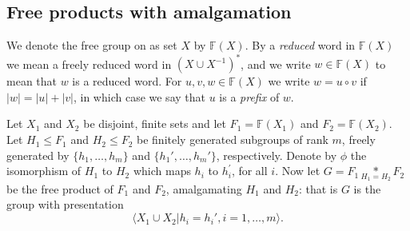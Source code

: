 \documentclass[a4paper,12pt]{article}
\numberwithin{equation}{section}
\numberwithin{figure}{section}
\newcommand{\FF}{\ensuremath{\mathbb{F}}}
\newcommand{\la}{\langle}
\newcommand{\ra}{\rangle}
\begin{document}
\subsection{Free products with amalgamation}\label{sec:intro}

We denote the free group on as set $X$ by $\FF(X)$.
 By a {\em reduced} word in $\FF(X)$  we mean
 a freely reduced word in $(X\cup X^{-1})^\ast$, and we write $w\in \FF(X)$
to mean that $w$ is a reduced word. For $u,v, w\in \FF(X)$ we
write $w=u\circ v$ if $|w|=|u|+|v|$, in which case we say that $u$ is a {\em prefix}
of $w$.

Let $X_1$ and $X_2$ be disjoint,
finite sets and let
$F_1=\FF(X_1)$ and $F_2=\FF(X_2)$.
Let $H_1 \leq F_1$ and  $H_2 \leq F_2$ be finitely generated subgroups of rank $m$,
freely generated by $\{h_1,\ldots, h_m\}$ and  $\{h_1', \ldots, h_m'\}$, respectively.
Denote by $\phi$ the isomorphism of $H_1$ to $H_2$ which maps $h_i$ to  $h_i^\prime$,
for all $i$.
 Now let $G = F_1 \underset{H_1=H_2}{\ast} F_2$ be the free product  of $F_1$ and 
$F_2$, amalgamating $H_1$ and $H_2$: that is $G$ is the group
 with
 presentation \[\la X_1\cup X_2 | h_i = h_i', i=1, \ldots ,m\ra.\]
\end{document}
